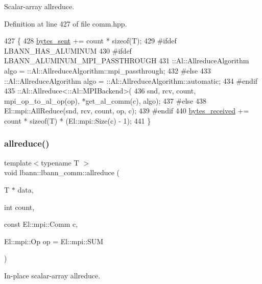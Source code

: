 Scalar-\/array allreduce. 

Definition at line 427 of file comm.\+hpp.


\begin{DoxyCode}
427                                                                                       \{
428     \hyperlink{classlbann_1_1lbann__comm_ad1f146ae7337ece6266fd307944928e0}{bytes\_sent} += count * \textcolor{keyword}{sizeof}(T);
429 \textcolor{preprocessor}{#ifdef LBANN\_HAS\_ALUMINUM}
430 \textcolor{preprocessor}{#ifdef LBANN\_ALUMINUM\_MPI\_PASSTHROUGH}
431     ::Al::AllreduceAlgorithm algo = ::Al::AllreduceAlgorithm::mpi\_passthrough;
432 \textcolor{preprocessor}{#else}
433     ::Al::AllreduceAlgorithm algo = ::Al::AllreduceAlgorithm::automatic;
434 \textcolor{preprocessor}{#endif}
435     ::Al::Allreduce<::Al::MPIBackend>(
436       snd, rcv, count, mpi\_op\_to\_al\_op(op), *get\_al\_comm(c), algo);
437 \textcolor{preprocessor}{#else}
438     El::mpi::AllReduce(snd, rcv, count, op, c);
439 \textcolor{preprocessor}{#endif}
440     \hyperlink{classlbann_1_1lbann__comm_afb99f57f7eafc0695bf28e6c26a8120f}{bytes\_received} += count * \textcolor{keyword}{sizeof}(T) * (El::mpi::Size(c) - 1);
441   \}
\end{DoxyCode}
\mbox{\label{classlbann_1_1lbann__comm_a14adb0771b966f40536bf0e92fb00ebb}} 
\subsubsection{\texorpdfstring{allreduce()}{allreduce()}\hspace{0.1cm}{\footnotesize\ttfamily [3/4]}}
{\footnotesize\ttfamily template$<$typename T $>$ \\
void lbann\+::lbann\+\_\+comm\+::allreduce (\begin{DoxyParamCaption}\item[{T $\ast$}]{data,  }\item[{int}]{count,  }\item[{const El\+::mpi\+::\+Comm}]{c,  }\item[{El\+::mpi\+::\+Op}]{op = {\ttfamily El\+:\+:mpi\+:\+:SUM} }\end{DoxyParamCaption})\hspace{0.3cm}{\ttfamily [inline]}}

In-\/place scalar-\/array allreduce. 

